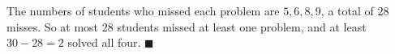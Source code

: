 The numbers of students who missed each problem are $5,6,8,9$, a total of $28$ misses. So at most $28$ students missed at least one problem, and at least $30-28=2$ solved all four. $\blacksquare$
